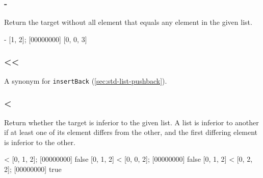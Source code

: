 \subsubsection{-}

Return the target without all element that equals any element in the
given list.

\begin{urbiscript}
[0, 1, 0, 2, 3] - [1, 2];
[00000000] [0, 0, 3]
\end{urbiscript}

\subsubsection{\textless\textless}

A synonym for \lstinline|insertBack| (\autoref{sec:std-list-pushback}).

\subsubsection{\textless}

Return whether the target is inferior to the given list. A list is
inferior to another if at least one of its element differs from the
other, and the first differing element is inferior to the other.

\begin{urbiscript}
[0, 1, 2] < [0, 1, 2];
[00000000] false
[0, 1, 2] < [0, 0, 2];
[00000000] false
[0, 1, 2] < [0, 2, 2];
[00000000] true
\end{urbiscript}


